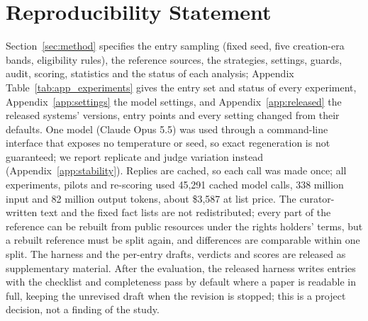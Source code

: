 \documentclass{article} %
\begin{document}
\section*{Reproducibility Statement}
Section~\ref{sec:method} specifies the entry sampling (fixed seed, five creation-era bands, eligibility rules), the reference sources, the strategies, settings, guards, audit, scoring, statistics and the status of each analysis; Appendix Table~\ref{tab:app_experiments} gives the entry set and status of every experiment, Appendix~\ref{app:settings} the model settings, and Appendix~\ref{app:released} the released systems' versions, entry points and every setting changed from their defaults. One model (Claude Opus 5.5) was used through a command-line interface that exposes no temperature or seed, so exact regeneration is not guaranteed; we report replicate and judge variation instead (Appendix~\ref{app:stability}). Replies are cached, so each call was made once; all experiments, pilots and re-scoring used 45,291 cached model calls, 338 million input and 82 million output tokens, about \$3,587 at list price. The curator-written text and the fixed fact lists are not redistributed; every part of the reference can be rebuilt from public resources under the rights holders' terms, but a rebuilt reference must be split again, and differences are comparable within one split. The harness and the per-entry drafts, verdicts and scores are released as supplementary material. After the evaluation, the released harness writes entries with the checklist and completeness pass by default where a paper is readable in full, keeping the unrevised draft when the revision is stopped; this is a project decision, not a finding of the study.




\clearpage
\appendix
\setlength{\belowcaptionskip}{4pt}
\makeatletter
\setlength{\@fptop}{0pt}
\setlength{\@fpbot}{0pt plus 1fil}
\setlength{\@fpsep}{8pt plus 2pt minus 2pt}
\setlength{\abovecaptionskip}{4pt}
\setlength{\intextsep}{8pt plus 2pt minus 2pt}
\setlength{\floatsep}{8pt plus 2pt minus 2pt}
\setlength{\textfloatsep}{12pt plus 2pt minus 2pt}
\makeatother
\FloatBarrier
\end{document}
